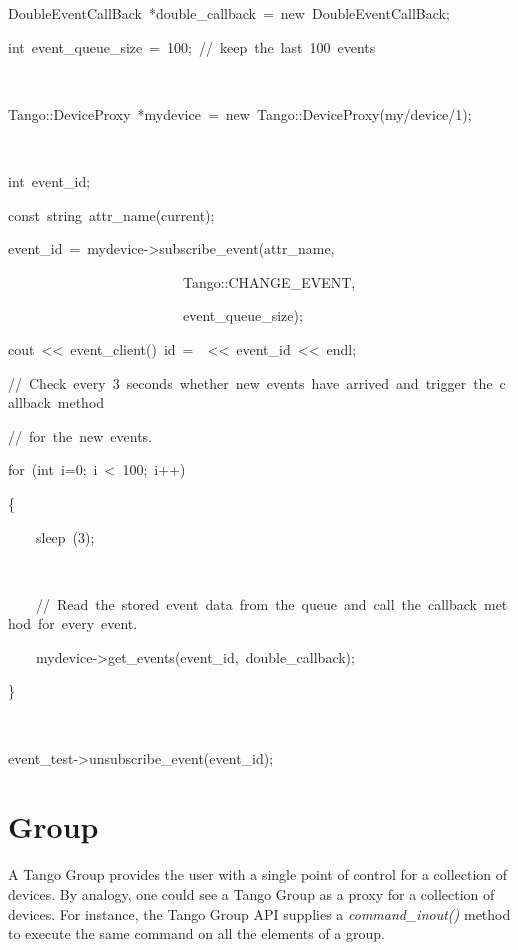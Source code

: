 
\begin{lyxcode}
DoubleEventCallBack~{*}double\_callback~=~new~DoubleEventCallBack;

int~event\_queue\_size~=~100;~//~keep~the~last~100~events

~~~~~~

Tango::DeviceProxy~{*}mydevice~=~new~Tango::DeviceProxy(\textquotedbl{}my/device/1\textquotedbl{});

~

int~event\_id;

const~string~attr\_name(\textquotedbl{}current\textquotedbl{});

event\_id~=~mydevice->subscribe\_event(attr\_name,~

~~~~~~~~~~~~~~~~~~~~~~~~~Tango::CHANGE\_EVENT,

~~~~~~~~~~~~~~~~~~~~~~~~~event\_queue\_size);

cout~<\textcompwordmark{}<~\textquotedbl{}event\_client()~id~=~\textquotedbl{}~<\textcompwordmark{}<~event\_id~<\textcompwordmark{}<~endl;



//~Check~every~3~seconds~whether~new~events~have~arrived~and~trigger~the~callback~method~

//~for~the~new~events.



for~(int~i=0;~i~<~100;~i++)

\{

~~~~sleep~(3);~

~~~~

~~~~//~Read~the~stored~event~data~from~the~queue~and~call~the~callback~method~for~every~event.

~~~~mydevice->get\_events(event\_id,~double\_callback);

\}

~

event\_test->unsubscribe\_event(event\_id);
\end{lyxcode}



\section{Group}

A Tango Group provides the user with a single point of control for
a collection of devices. By analogy, one could see a Tango Group as
a proxy for a collection of devices. For instance, the Tango Group
API supplies a \emph{command\_inout()} method to execute the same
command on all the elements of a group. 

